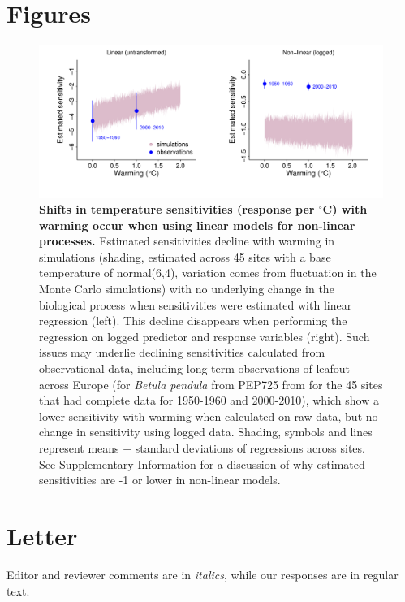 \documentclass[11pt,letter]{article}
\begin{document}
\newpage
\section* {Figures}

\begin{figure}[h!]
\centering
\noindent \includegraphics[width=1.05\textwidth]{..//analyses/figures/basicsimsandpepalt1.pdf} %
\caption{\textbf{Shifts in temperature sensitivities (response per $^{\circ}$C)  with warming occur when using linear models for non-linear processes.} Estimated sensitivities decline with warming in simulations (shading, estimated across 45 sites with a base temperature of normal(6,4), variation comes from fluctuation in the Monte Carlo simulations) with no underlying change in the biological process when sensitivities were estimated with linear regression (left). This decline disappears when performing the regression on logged predictor and response variables (right). Such issues may underlie declining sensitivities calculated from observational data, including long-term observations of leafout across Europe (for \emph{Betula pendula} from PEP725 from for the 45 sites that had complete data for 1950-1960 and 2000-2010), which show a lower sensitivity with warming when calculated on raw data, but no change in sensitivity using logged data. Shading, symbols and lines represent means $\pm$ standard deviations of regressions across sites. See Supplementary Information for a discussion of why estimated sensitivities are -1 or lower in non-linear models.} %
\label{fig:basicsimswpep} %
\end{figure}

\clearpage
\nolinenumbers
{}
\section{Letter}
Editor and reviewer comments are in \emph{italics}, while our responses are in regular text. \\ %
\end{document}

